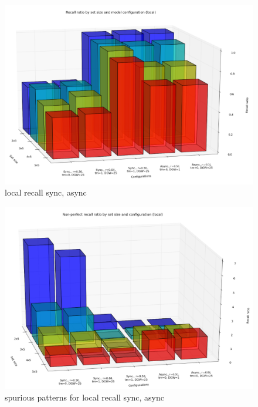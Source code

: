 
\begin{figure}
    \centering
    \includegraphics[width=13cm]{fig/i-iters/local-recall}
    \caption{local recall sync, async}
    \label{fig:local-recall}
\end{figure}

\begin{figure}
    \centering
    \includegraphics[width=13cm]{fig/i-iters/local-recall-spurious}
    \caption{spurious patterns for local recall sync, async}
    \label{fig:local-recall-spurious}
\end{figure}

